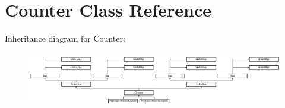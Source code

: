 \hypertarget{classCounter}{\section{Counter Class Reference}
\label{classCounter}
}
Inheritance diagram for Counter\-:\begin{figure}[H]
\begin{center}
\leavevmode
\includegraphics[height=2.456140cm]{classCounter}
\end{center}
\end{figure}

